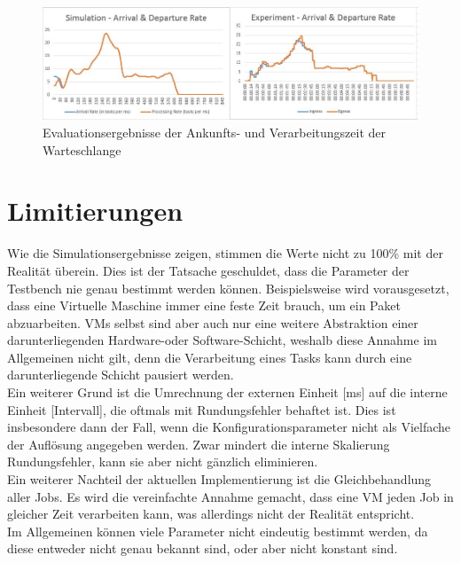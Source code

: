 \begin{figure}[!h]
	\includegraphics[width=\textwidth, trim={0cm 0cm 0cm 0cm}]{img/queueArrival.jpg}
	\caption{Evaluationsergebnisse der Ankunfts- und Verarbeitungszeit der Warteschlange}
	\label{fig:queueArrival}
\end{figure}



\section{Limitierungen}
Wie die Simulationsergebnisse zeigen, stimmen die Werte nicht zu 100\% mit der Realität überein. Dies ist der Tatsache geschuldet, dass die Parameter der Testbench nie genau bestimmt werden können. Beispielsweise wird vorausgesetzt, dass eine Virtuelle Maschine immer eine feste Zeit brauch, um ein Paket abzuarbeiten. VMs selbst sind aber auch nur eine weitere Abstraktion einer darunterliegenden Hardware-oder Software-Schicht, weshalb diese Annahme im Allgemeinen nicht gilt, denn die Verarbeitung eines Tasks kann durch eine darunterliegende Schicht pausiert werden. \\
Ein weiterer Grund ist die Umrechnung der externen Einheit [ms] auf die interne Einheit [Intervall], die oftmals mit Rundungsfehler behaftet ist. Dies ist insbesondere dann der Fall, wenn die Konfigurationsparameter nicht als Vielfache der Auflösung angegeben werden. Zwar mindert die interne Skalierung Rundungsfehler, kann sie aber nicht gänzlich eliminieren. \\
Ein weiterer Nachteil der aktuellen Implementierung ist die Gleichbehandlung aller Jobs. Es wird die vereinfachte Annahme gemacht, dass eine VM jeden Job in gleicher Zeit verarbeiten kann, was allerdings nicht der Realität entspricht. \\
Im Allgemeinen können viele Parameter nicht eindeutig bestimmt werden, da diese entweder nicht genau bekannt sind, oder aber nicht konstant sind.



